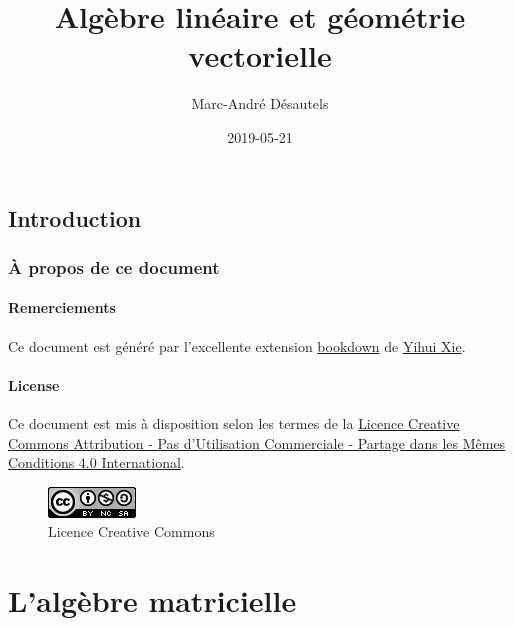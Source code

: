 \documentclass[]{book}
\title{Algèbre linéaire et géométrie vectorielle}
\author{Marc-André Désautels}
\date{2019-05-21}
\theoremstyle{definition}
\theoremstyle{definition}
\theoremstyle{definition}
\theoremstyle{remark}
\begin{document}
\maketitle

{
\setcounter{tocdepth}{2}
\tableofcontents
}
\hypertarget{introduction}{%
\chapter*{Introduction}\label{introduction}}

\hypertarget{a-propos-de-ce-document}{%
\section*{À propos de ce document}\label{a-propos-de-ce-document}}

\hypertarget{remerciements}{%
\subsection*{Remerciements}\label{remerciements}}

Ce document est généré par l'excellente extension \href{https://bookdown.org/}{bookdown} de \href{https://yihui.name/}{Yihui Xie}.

\hypertarget{license}{%
\subsection*{License}\label{license}}

Ce document est mis à disposition selon les termes de la \href{http://creativecommons.org/licenses/by-nc-sa/4.0/}{Licence Creative Commons Attribution - Pas d'Utilisation Commerciale - Partage dans les Mêmes Conditions 4.0 International}.

\begin{figure}
\centering
\includegraphics{resources/icons/license_cc.png}
\caption{Licence Creative Commons}
\end{figure}

\hypertarget{part-lalgebre-matricielle}{%
\part{L'algèbre matricielle}\label{part-lalgebre-matricielle}}
\end{document}

